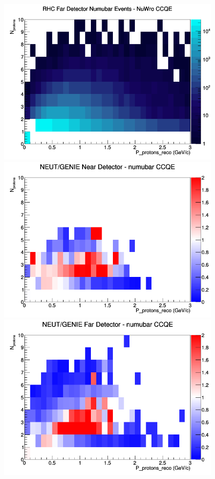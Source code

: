 \begin{figure}[h]
\endminipage
{}
\includegraphics[width=\linewidth]{eff_N_P/FGT/protons/CCQE_RHC_FD_numubar_N_P_NuWro.png}
\endminipage
\newline
{}
\includegraphics[width=\linewidth]{eff_N_P/FGT/protons/ratios/CCQE_NEUT_GENIE_numubar_near_N_P.png}
\endminipage
{}
\includegraphics[width=\linewidth]{eff_N_P/FGT/protons/ratios/CCQE_NEUT_GENIE_numubar_far_N_P.png}

\end{figure}
